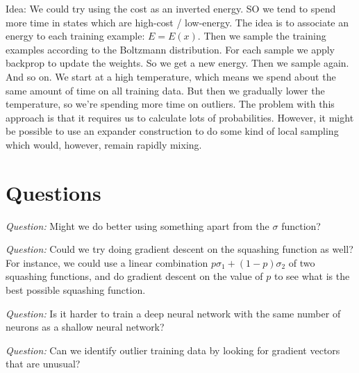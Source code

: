 \documentclass[12pt]{article}
\begin{document}
Idea: We could try using the cost as an inverted energy.  SO we tend
to spend more time in states which are high-cost / low-energy.  The
idea is to associate an energy to each training example: $E = E(x)$.
Then we sample the training examples according to the Boltzmann
distribution.  For each sample we apply backprop to update the
weights.  So we get a new energy.  Then we sample again.  And so on.
We start at a high temperature, which means we spend about the same
amount of time on all training data.  But then we gradually lower the
temperature, so we're spending more time on outliers.  The problem
with this approach is that it requires us to calculate lots of
probabilities.  However, it might be possible to use an expander
construction to do some kind of local sampling which would, however,
remain rapidly mixing.

\section{Questions}

\emph{Question:} Might we do better using something apart from the
$\sigma$ function?

\emph{Question:} Could we try doing gradient descent on the squashing
function as well?  For instance, we could use a linear combination $p
\sigma_1+(1-p) \sigma_2$ of two squashing functions, and do gradient
descent on the value of $p$ to see what is the best possible squashing
function.

\emph{Question:} Is it harder to train a deep neural network with the
same number of neurons as a shallow neural network?

\emph{Question:} Can we identify outlier training data by looking for
gradient vectors that are unusual?
\end{document}
